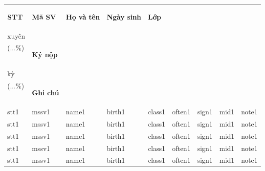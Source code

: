 \documentclass[14pt,a4paper]{article}
\begin{document}
\begin{tabular}{ m{0.7cm} | m{2cm}| m{4cm} | m{2cm} | m{2.5cm} | m{1.2cm} | m{1.5cm} | m{1cm} | m{1.6cm} | }
	\toprule[0.4mm]
	\begin{center}\textbf{STT }\end{center}&\begin{center}\textbf{Mã SV}\end{center} &\begin{center}\textbf{Họ và tên}\end{center} &\begin{center} \textbf{Ngày sinh}\end{center} &\begin{center} \textbf{Lớp}\end{center} &\vspace{-0.2cm}\begin{center} \textbf{Thường\vspace{-0.2cm}\\xuyên\vspace{-0.2cm}\\(...\%)\vspace{-0.6cm} }\end{center} & \begin{center} \textbf{Ký nộp }\end{center}&\vspace{-0.2cm}\begin{center} \textbf{Giữa\vspace{-0.2cm}\\kỳ\vspace{-0.2cm}\\(...\%)\vspace{-0.6cm} }\end{center} &\begin{center} \textbf{Ghi chú}\vspace{-0cm}\end{center}\\
	\hline
	stt1 & mssv1 & name1 & birth1 & class1 & often1 & sign1 & mid1 & note1\\
	\hline
	stt1 & mssv1 & name1 & birth1 & class1 & often1 & sign1 & mid1 & note1\\
	\hline
	stt1 & mssv1 & name1 & birth1 & class1 & often1 & sign1 & mid1 & note1\\
	\hline
	stt1 & mssv1 & name1 & birth1 & class1 & often1 & sign1 & mid1 & note1\\
	\hline
	stt1 & mssv1 & name1 & birth1 & class1 & often1 & sign1 & mid1 & note1\\

\end{tabular}
\end{document}
